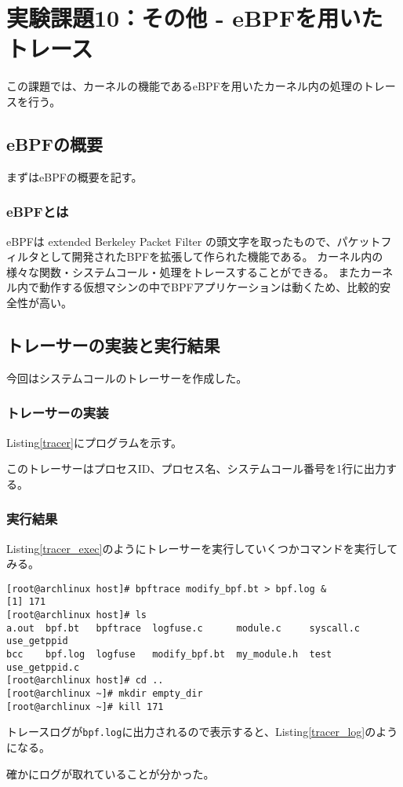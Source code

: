 \documentclass[main]{subfiles}
\begin{document}
\section{実験課題10：その他 - eBPFを用いたトレース}

この課題では、カーネルの機能であるeBPFを用いたカーネル内の処理のトレースを行う。

\subsection{eBPFの概要}

まずはeBPFの概要を記す。

\subsubsection{eBPFとは}

eBPFは extended Berkeley Packet Filter の頭文字を取ったもので、パケットフィルタとして開発されたBPFを拡張して作られた機能である。
カーネル内の様々な関数・システムコール・処理をトレースすることができる。
またカーネル内で動作する仮想マシンの中でBPFアプリケーションは動くため、比較的安全性が高い。

\subsection{トレーサーの実装と実行結果}

今回はシステムコールのトレーサーを作成した。

\subsubsection{トレーサーの実装}

Listing\ref{tracer}にプログラムを示す。



このトレーサーはプロセスID、プロセス名、システムコール番号を1行に出力する。

\subsubsection{実行結果}

Listing\ref{tracer_exec}のようにトレーサーを実行していくつかコマンドを実行してみる。

\begin{lstlisting}[label=tracer_exec,caption=トレーサーを実行していくつかコマンドを打ってみる]
[root@archlinux host]# bpftrace modify_bpf.bt > bpf.log &
[1] 171
[root@archlinux host]# ls
a.out  bpf.bt   bpftrace  logfuse.c      module.c     syscall.c  use_getppid
bcc    bpf.log  logfuse   modify_bpf.bt  my_module.h  test       use_getppid.c
[root@archlinux host]# cd ..
[root@archlinux ~]# mkdir empty_dir
[root@archlinux ~]# kill 171
\end{lstlisting}

トレースログが\texttt{bpf.log}に出力されるので表示すると、Listing\ref{tracer_log}のようになる。



確かにログが取れていることが分かった。
\end{document}
